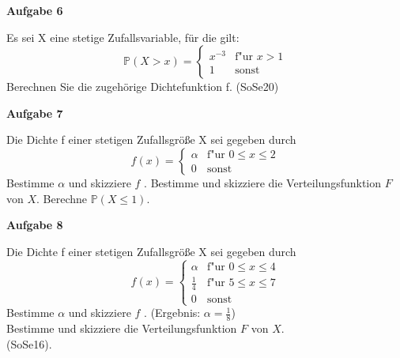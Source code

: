 \documentclass[a4paper,12pt]{article}
\newcommand{\Aufgabe}[1]{
  {
  \vspace*{0.5cm}
  \textsf{\textbf{Aufgabe #1}}
  \vspace*{0.2cm}
  
  }
}
\begin{document}
\Aufgabe{6}
Es sei X eine stetige Zufallsvariable, für die gilt:
\begin{equation}
   \mathbb{P}(X >x) = \begin{cases}
     x^{-3} & \text{f"ur } x > 1 \\
    1 & \text{sonst }  
   \end{cases}
\end{equation}
Berechnen Sie die zugehörige Dichtefunktion f.
(SoSe20)


\Aufgabe{7}
Die Dichte f einer stetigen Zufallsgröße X sei gegeben durch 
\begin{equation}
   f(x) = \begin{cases}
     \alpha & \text{f"ur } 0 \leq x \le 2 \\
    0 & \text{sonst }  
   \end{cases}
\end{equation}
Bestimme $ \alpha$ und skizziere $f$ .
Bestimme und skizziere die Verteilungsfunktion $F$ von $X$.
Berechne $\mathbb{P}(X \leq 1)$. \\





\Aufgabe{8}
Die Dichte f einer stetigen Zufallsgröße X sei gegeben durch 
\begin{equation}
   f(x) = \begin{cases}
     \alpha & \text{f"ur } 0 \leq x \le 4 \\
     \frac{1}{4} & \text{f"ur } 5 \leq x \le 7 \\
    0 & \text{sonst }  
   \end{cases}
\end{equation}
Bestimme $ \alpha$ und skizziere $f$ . (Ergebnis: $\alpha = \frac{1}{8}$) \\
Bestimme und skizziere die Verteilungsfunktion $F$ von $X$. \\
 (SoSe16).


\end{document}
